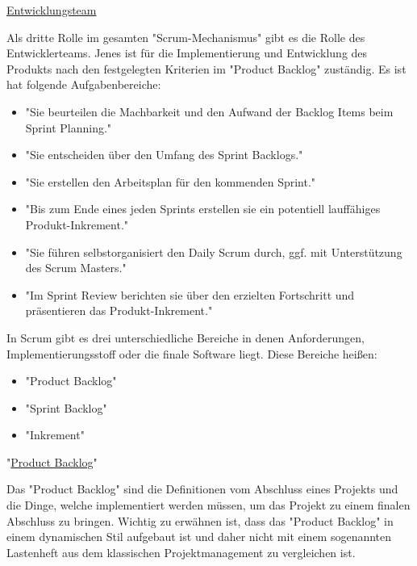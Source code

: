 \underline{Entwicklungsteam}

Als dritte Rolle im gesamten "Scrum-Mechanismus" gibt es die Rolle des Entwicklerteams. Jenes ist für die Implementierung und Entwicklung des Produkts nach den festgelegten Kriterien im "Product Backlog" zuständig. Es ist hat folgende Aufgabenbereiche: \cite{Entwicklungsteam}

\begin{itemize}
    \item "Sie beurteilen die Machbarkeit und den Aufwand der Backlog Items beim Sprint Planning." \cite{Entwicklungsteam}
    \item "Sie entscheiden über den Umfang des Sprint Backlogs." \cite{Entwicklungsteam}
    \item "Sie erstellen den Arbeitsplan für den kommenden Sprint." \cite{Entwicklungsteam}
    \item "Bis zum Ende eines jeden Sprints erstellen sie ein potentiell lauffähiges Produkt-Inkrement." \cite{Entwicklungsteam}
    \item "Sie führen selbstorganisiert den Daily Scrum durch, ggf. mit Unterstützung des Scrum Masters." \cite{Entwicklungsteam}
    \item "Im Sprint Review berichten sie über den erzielten Fortschritt und präsentieren das Produkt-Inkrement." \cite{Entwicklungsteam}
\end{itemize}


In Scrum gibt es drei unterschiedliche Bereiche in denen Anforderungen, Implementierungsstoff oder die finale Software liegt. Diese Bereiche heißen:

\begin{itemize}
    \item "Product Backlog"
    \item "Sprint Backlog"
    \item "Inkrement"
\end{itemize}

\cite{Scrum}

"\underline{Product Backlog}"

Das "Product Backlog" sind die Definitionen vom Abschluss eines Projekts und die Dinge, welche implementiert werden müssen, um das Projekt zu einem finalen Abschluss zu bringen. Wichtig zu erwähnen ist, dass das "Product Backlog" in einem dynamischen Stil aufgebaut ist und daher nicht mit einem sogenannten Lastenheft aus dem klassischen Projektmanagement zu vergleichen ist. \cite{ProductBacklog}


